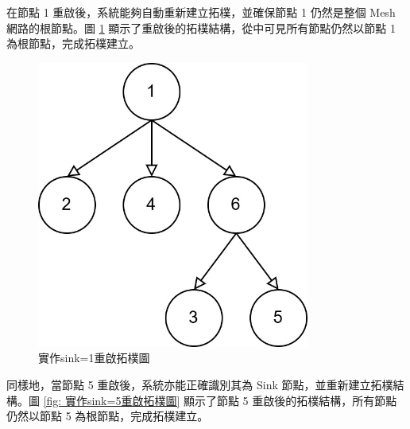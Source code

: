 \begin{ZhChapter}
在節點 1 重啟後，系統能夠自動重新建立拓樸，並確保節點 1 仍然是整個 Mesh 網路的根節點。圖 \ref{fig: 實作sink=1重啟拓樸圖} 顯示了重啟後的拓樸結構，從中可見所有節點仍然以節點 1 為根節點，完成拓樸建立。

\begin{figure}[H]
    \centering
    \includegraphics[width = 0.8\textwidth]{image/實作sink=1重啟拓樸圖.jpg}
    \caption{實作sink=1重啟拓樸圖}
    \label{fig: 實作sink=1重啟拓樸圖}
\end{figure}

同樣地，當節點 5 重啟後，系統亦能正確識別其為 Sink 節點，並重新建立拓樸結構。圖 \ref{fig: 實作sink=5重啟拓樸圖} 顯示了節點 5 重啟後的拓樸結構，所有節點仍然以節點 5 為根節點，完成拓樸建立。


\end{ZhChapter}
